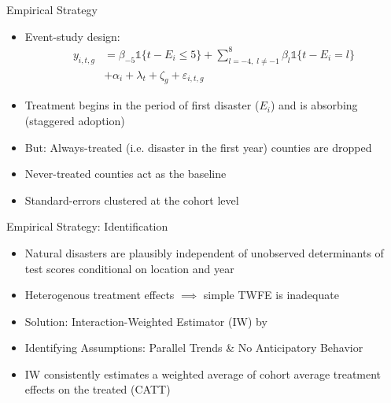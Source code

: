 \documentclass[hyperref={colorlinks = true,linkcolor = blue, citecolor=blue,urlcolor=blue}]{beamer}
\begin{document}
\begin{frame}{Empirical Strategy}
	\begin{itemize}
		\item Event-study design:
		\begin{align*}
			y_{i, t, g} &= \beta_{-5}  \mathds{1}\{t - E_i \leq 5\} + \sum_{l = -4, \; l \neq -1}^{8} \beta_l \mathds{1}\{t - E_i = l\} \\ &+ \alpha_i + \lambda_t + \zeta_g + \varepsilon_{i, t, g}
		\end{align*}
		\item Treatment begins in the period of first disaster ($E_i$) and is absorbing (staggered adoption)
		\item But: Always-treated (i.e. disaster in the first year) counties are dropped
		\item Never-treated counties act as the baseline
		\item Standard-errors clustered at the cohort level \citep{Abadie_2017}
	\end{itemize}
\end{frame}

\begin{frame}{Empirical Strategy: Identification}
	\begin{itemize}
		\item Natural disasters are plausibly independent of unobserved determinants of test scores conditional on location and year
		\item Heterogenous treatment effects $\implies$ simple TWFE is inadequate \citep{deChaisemartin_2020, Sun_2021}
		\item Solution: Interaction-Weighted Estimator (IW) by \cite{Sun_2021}
		\item Identifying Assumptions: Parallel Trends \& No Anticipatory Behavior
		\item IW consistently estimates a weighted average of cohort average treatment effects on the treated (CATT)
	\end{itemize}
\end{frame}
\end{document}
